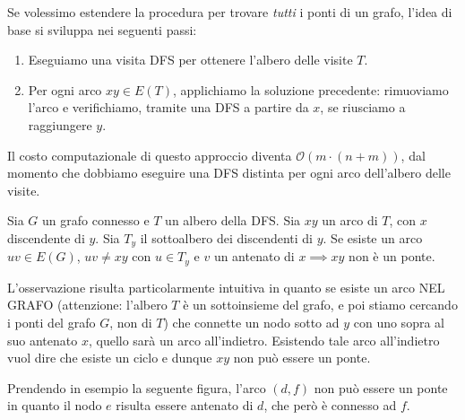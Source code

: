\documentclass[12pt]{report}
\begin{document}
	Se volessimo estendere la procedura per trovare \textit{tutti} i ponti di un grafo, l'idea di base si sviluppa nei seguenti passi:
	\begin{enumerate}
		\item Eseguiamo una visita DFS per ottenere l'albero delle visite $T$.
		\item Per ogni arco $xy \in E(T)$, applichiamo la soluzione precedente: rimuoviamo l'arco e verifichiamo, tramite una DFS a partire da $x$, se riusciamo a raggiungere $y$.
	\end{enumerate}
	
	Il costo computazionale di questo approccio diventa $\mathcal{O}(m \cdot (n + m))$, dal momento che dobbiamo eseguire una DFS distinta per ogni arco dell'albero delle visite.
	
	\begin{osservazione}{}{}
		Sia $G$ un grafo connesso e $T$ un albero della DFS.
		Sia $xy$ un arco di $T$, con $x$ discendente di $y$.
		Sia $T_y$ il sottoalbero dei discendenti di $y$.
		Se esiste un arco $uv \in E(G)$, $uv \neq xy$ con $u \in T_y$ e $v$ un antenato di $x \implies xy$ non è un ponte.
	\end{osservazione}	
	
	L'osservazione risulta particolarmente intuitiva in quanto se esiste un arco NEL GRAFO (attenzione: l'albero $T$ è un sottoinsieme del grafo, e poi stiamo cercando i ponti del grafo $G$, non di $T$) che connette un nodo sotto ad $y$ con uno sopra al suo antenato $x$, quello sarà un arco all'indietro. Esistendo tale arco all'indietro vuol dire che esiste un ciclo e dunque $xy$ non può essere un ponte.
	
	Prendendo in esempio la seguente figura, l'arco $(d, f)$ non può essere un ponte in quanto il nodo $e$ risulta essere antenato di $d$, che però è connesso ad $f$.
\end{document}
